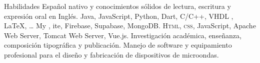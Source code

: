 
\begin{rubric}{Habilidades}
\entry*[Idiomas]
	Español nativo y conocimientos sólidos de lectura, escritura y expresión oral en Inglés.
	Java, JavaScript, Python, Dart, C/C++, VHDL , \LaTeX, \ldots
{}
	My , ite, Firebase, Supabase, MongoDB.
	\textsc{Html, css}, JavaScript, Apache Web Server, Tomcat Web Server, Vue.js.
\entry*[Otras]
	Investigación académica, enseñanza, composición tipográfica y publicación. Manejo de software y equipamiento profesional para el diseño y fabricación de dispositivos de microondas. 
\end{rubric}

